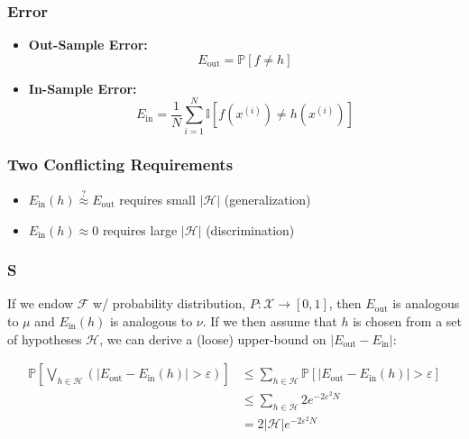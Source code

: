 \subsubsection{Error}
\begin{definition}
    \begin{itemize}
        \item \textbf{Out-Sample Error:}
        \begin{equation*}
            E_{\text{out}} = \mathbb{P}[f \neq h]
        \end{equation*}
        \item \textbf{In-Sample Error:}
        \begin{equation*}
            E_{\text{in}} = \frac{1}{N} \sum_{i=1}^{N} \mathbb{I}[f(x^{(i)}) \neq h(x^{(i)})]
        \end{equation*}
    \end{itemize}
\end{definition}

\subsubsection{Two Conflicting Requirements}
\begin{definition}
    \begin{itemize}
        \item $E_{\text{in}}(h) \stackrel{?}{\approx} E_{\text{out}}$ requires small $|\mathcal{H}|$ (generalization)
        \item $E_{\text{in}}(h) \approx 0$ requires large $|\mathcal{H}|$ (discrimination)
    \end{itemize}
\end{definition}

\subsubsection{S}
\begin{definition}
    If we endow $\mathcal{F}$ w/ probability distribution, $P : \mathcal{X} \to [0,1]$, then $E_{\text{out}}$ is analogous to $\mu$ and $E_{\text{in}}(h)$ is analogous to $\nu$. If we then assume that $h$ is chosen from a set of hypotheses $\mathcal{H}$, we can derive a (loose) upper-bound on $|E_{\text{out}} - E_{\text{in}}|$:

    \begin{align*}
        \mathbb{P} \left[ \bigvee_{h \in \mathcal{H}} \left( |E_{\text{out}} - E_{\text{in}}(h)| > \varepsilon \right) \right]
        &\leq \sum_{h \in \mathcal{H}} \mathbb{P} \left[ |E_{\text{out}} - E_{\text{in}}(h)| > \varepsilon \right] \\
        &\leq \sum_{h \in \mathcal{H}} 2e^{-2\varepsilon^2 N} \\
        &= 2 |\mathcal{H}| e^{-2\varepsilon^2 N} 
    \end{align*}
\end{definition}

